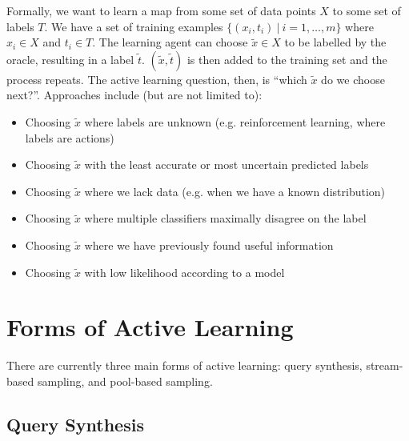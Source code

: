 \documentclass[a4paper]{article}
\begin{document}

        Formally, we want to learn a map from some set of data points $X$ to some set of labels $T$. We have a set of training examples $\{(x_i, t_i)\ |\ i = 1, \dots, m\}$ where $x_i \in X$ and $t_i \in T$. The learning agent can choose $\tilde x \in X$ to be labelled by the oracle, resulting in a label $\tilde t$. $(\tilde x, \tilde t)$ is then added to the training set and the process repeats\cite{cohn96}. The active learning question, then, is ``which $\tilde x$ do we choose next?''. Approaches include (but are not limited to):
        \begin{itemize}
            \item Choosing $\tilde x$ where labels are unknown (e.g. reinforcement learning, where labels are actions)\cite{whitehead91}
            \item Choosing $\tilde x$ with the least accurate or most uncertain predicted labels\cite{mackay92,thrun92,lewis94}
            \item Choosing $\tilde x$ where we lack data (e.g. when we have a known distribution)\cite{atlas90}
            \item Choosing $\tilde x$ where multiple classifiers maximally disagree on the label\cite{seung92}
            \item Choosing $\tilde x$ where we have previously found useful information\cite{storck95}
            \item Choosing $\tilde x$ with low likelihood according to a model\cite{loy11}
        \end{itemize}

    \section{Forms of Active Learning}

        There are currently three main forms of active learning: query synthesis, stream-based sampling, and pool-based sampling\cite{settles09,guyon11}.

        \subsection{Query Synthesis}
\end{document}
